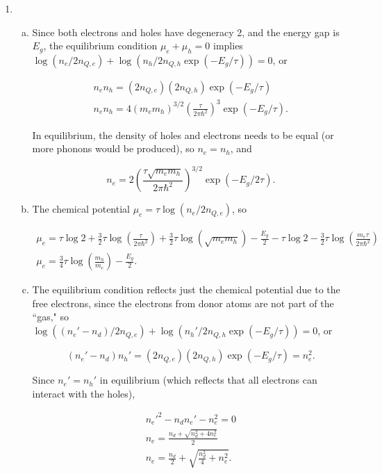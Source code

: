 \documentclass{article}
\begin{document}
\begin{enumerate}
\begin{enumerate}[(a)]
	\end{enumerate}

	\item

	\begin{enumerate}[(a)]

		\item

		Since both electrons and holes have degeneracy 2, and the energy gap is $E_g$, the equilibrium condition $\mu_e + \mu_h = 0$ implies $\log (n_e / 2n_{Q,e}) + \log(n_h / 2n_{Q,h} \exp(-E_g/\tau)) =0$, or

		\begin{gather*}
		n_e n_h = (2n_{Q,e})(2n_{Q,h}) \exp(-E_g/\tau) \\
		n_e n_h = 4 (m_e m_h)^{3/2} \left( \frac{\tau}{2 \pi \hbar^2} \right)^3 \exp(-E_g/\tau).
		\end{gather*}

		In equilibrium, the density of holes and electrons needs to be equal (or more phonons would be produced), so $n_e = n_h$, and

		$$n_e = 2 \left( \frac{\tau \sqrt{m_e m_h}}{2 \pi \hbar^2} \right)^{3/2} \exp(-E_g/2\tau).$$

		\item

		The chemical potential $\mu_e = \tau \log(n_e / 2n_{Q,e})$, so

		\begin{gather*}
		\mu_e = \tau \log 2 + \frac{3}{2}\tau \log \left( \frac{\tau}{2 \pi \hbar^2} \right) + \frac{3}{2}\tau \log(\sqrt{m_em_h}) - \frac{E_g}{2} - \tau \log 2 - \frac{3}{2}\tau \log \left( \frac{m_e \tau}{2 \pi \hbar^2} \right) \\
		\mu_e = \frac{3}{4}\tau \log \left( \frac{m_h}{m_e} \right) - \frac{E_g}{2}.
		\end{gather*}

		\item

		The equilibrium condition reflects just the chemical potential due to the free electrons, since the electrons from donor atoms are not part of the ``gas," so $\log ((n_e' - n_d) / 2n_{Q,e}) + \log(n_h' / 2n_{Q,h} \exp(-E_g/\tau)) =0$, or

		$$
		(n_e' - n_d) n_h' = (2n_{Q,e})(2n_{Q,h}) \exp(-E_g/\tau) = n_e^2.
		$$

		Since $n_e' = n_h'$ in equilibrium (which reflects that all electrons can interact with the holes),

		\begin{gather*}
		n_e'^2 - n_d n_e' - n_e^2 = 0 \\
		n_e = \frac{n_d + \sqrt{n_d^2  +4n_e^2}}{2} \\
		n_e = \frac{n_d}{2} + \sqrt{\frac{n_d^2}{4} + n_e^2}.
		\end{gather*}




	\end{enumerate}

\end{enumerate}
\end{document}

